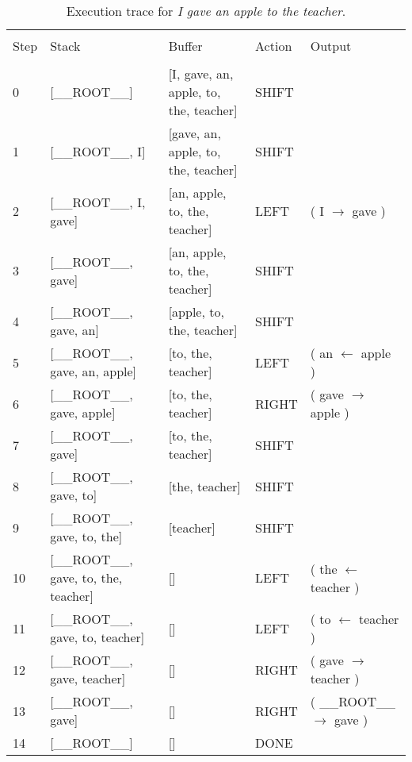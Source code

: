 \documentclass[
12pt,
a4paper,
oneside,
headinclude,
footinclude]{article}
\begin{document}
    \begin{center}
        \begin{table}[H]   
            \hspace*{-2.0cm}
            \begin{tabular}{l p{5cm} p{5cm} l l} %
                \hline
                \hline 
                \\[-1.5ex]
                \textcolor{BrickRed}{Step} & \textcolor{BrickRed}{Stack} & \textcolor{BrickRed}{Buffer} & \textcolor{BrickRed}{Action} & \textcolor{BrickRed}{Output}\\ [0.5ex]
                \hline %
                \\[-1.5ex]
                0 & [\_\_ROOT\_\_] & [I, gave, an, apple, to, the, teacher] & SHIFT & \\ 
                1 & [\_\_ROOT\_\_, I] & [gave, an, apple, to, the, teacher] & SHIFT & \\ 
                2 & [\_\_ROOT\_\_, I, gave] & [an, apple, to, the, teacher] & LEFT & ( I $\rightarrow$ gave )\\ 
                3 & [\_\_ROOT\_\_, gave] & [an, apple, to, the, teacher] & SHIFT & \\ 
                4 & [\_\_ROOT\_\_, gave, an] & [apple, to, the, teacher] & SHIFT & \\ 
                5 & [\_\_ROOT\_\_, gave, an, apple] & [to, the, teacher] & LEFT & ( an $\leftarrow$ apple )\\ 
                6 & [\_\_ROOT\_\_, gave, apple] & [to, the, teacher] & RIGHT & ( gave $\rightarrow$ apple )\\ 
                7 & [\_\_ROOT\_\_, gave] & [to, the, teacher] & SHIFT & \\ 
                8 & [\_\_ROOT\_\_, gave, to] & [the, teacher] & SHIFT & \\ 
                9 & [\_\_ROOT\_\_, gave, to, the] & [teacher] & SHIFT & \\ 
                10 & [\_\_ROOT\_\_, gave, to, the, teacher] & [] & LEFT & ( the $\leftarrow$ teacher )\\ 
                11 & [\_\_ROOT\_\_, gave, to, teacher] & [] & LEFT & ( to $\leftarrow$ teacher )\\ 
                12 & [\_\_ROOT\_\_, gave, teacher] & [] & RIGHT & ( gave $\rightarrow$ teacher )\\ 
                13 & [\_\_ROOT\_\_, gave] & [] & RIGHT & ( \_\_ROOT\_\_ $\rightarrow$ gave )\\ 
                14 & [\_\_ROOT\_\_] & [] & DONE &                 
                \\[1ex] %
                \hline %
            \end{tabular}
            \caption{\label{tab:trace-1}Execution trace for \textit{I gave an apple to the teacher}.}
        \end{table} 
    \end{center}
\end{document}
